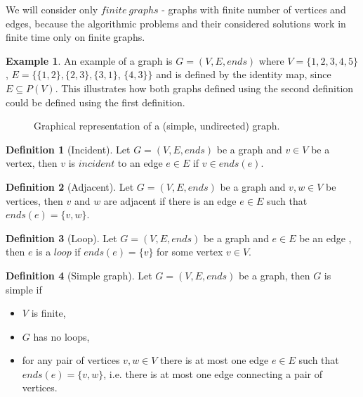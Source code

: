 \documentclass{report}
\theoremstyle{plain}
\theoremstyle{definition}
\newtheorem{definition}{Definition}
\newtheorem{example}{Example}
\theoremstyle{remark}
\numberwithin{definition}{chapter}
\numberwithin{example}{chapter}
\numberwithin{figure}{chapter}
\numberwithin{theorem}{chapter}
\numberwithin{lemma}{chapter}
\begin{document}
We will consider only $finite \ graphs$ - graphs with finite number of vertices and edges, because the algorithmic problems and their considered solutions work in finite time only on finite graphs.

\begin{example}
An example of a graph is $G=(V, E, ends)$ where $V=\{1,2,3,4,5\}$, $E=\{\{1,2\}, \{2,3\}, \{3,1\}$, $\{4,3\}\}$ and is defined by the identity map, since $E \subseteq P(V)$. This illustrates how both graphs defined using the second definition could be defined using the first definition.

\begin{figure}[h]
\center
{}
\caption{Graphical representation of a (simple, undirected) graph.}
\end{figure}
\end{example}

\begin{definition}[Incident]
Let $G = (V, E, ends)$ be a graph and $v\in V$ be a vertex, then $v$ is $incident$ to an edge $e \in E$ if $v \in ends(e)$.
\end{definition}

\begin{definition}[Adjacent]
Let $G = (V, E, ends)$ be a graph and $v,w\in V$ be vertices, then $v$ and $w$ are adjacent if there is an edge $ e \in E$ such that $ends(e) = \{v, w\}$.
\end{definition}

\begin{definition}[Loop]
Let $G = (V, E, ends)$ be a graph and $e \in E$ be an edge , then $e$ is a $loop$ if $ends(e) = \{v\}$ for some vertex $v \in V$.
\end{definition}

\begin{definition}[Simple graph]
Let $G = (V, E, ends)$ be a graph, then $G$ is simple if
\begin{itemize}
\item $V$ is finite,
\item $G$ has no loops,
\item for any pair of vertices $v,w \in V$ there is at most one edge $e \in E$ such that $ends(e) = \{v, w\}$, i.e. there is at most one edge connecting a pair of vertices.
\end{itemize}
\end{definition}
\end{document}
